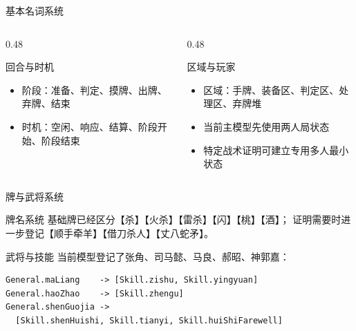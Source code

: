 \documentclass[UTF8,aspectratio=169]{ctexbeamer}
\begin{document}
\begin{frame}{基本名词系统}
  \begin{columns}[T]
    \begin{column}{0.48\textwidth}
      \begin{block}{回合与时机}
        \begin{itemize}
          \item 阶段：准备、判定、摸牌、出牌、弃牌、结束
          \item 时机：空闲、响应、结算、阶段开始、阶段结束
        \end{itemize}
      \end{block}
    \end{column}
    \begin{column}{0.48\textwidth}
      \begin{block}{区域与玩家}
        \begin{itemize}
          \item 区域：手牌、装备区、判定区、处理区、弃牌堆
          \item 当前主模型先使用两人局状态
          \item 特定战术证明可建立专用多人最小状态
        \end{itemize}
      \end{block}
    \end{column}
  \end{columns}
\end{frame}

\begin{frame}[fragile]{牌与武将系统}
  \begin{block}{牌名系统}
    基础牌已经区分【杀】【火杀】【雷杀】【闪】【桃】【酒】；
    证明需要时进一步登记【顺手牵羊】【借刀杀人】【丈八蛇矛】。
  \end{block}

  \begin{block}{武将与技能}
    当前模型登记了张角、司马懿、马良、郝昭、神郭嘉：
  \end{block}

  \begin{verbatim}
General.maLiang    -> [Skill.zishu, Skill.yingyuan]
General.haoZhao    -> [Skill.zhengu]
General.shenGuojia ->
  [Skill.shenHuishi, Skill.tianyi, Skill.huiShiFarewell]
  \end{verbatim}
\end{frame}
\end{document}
